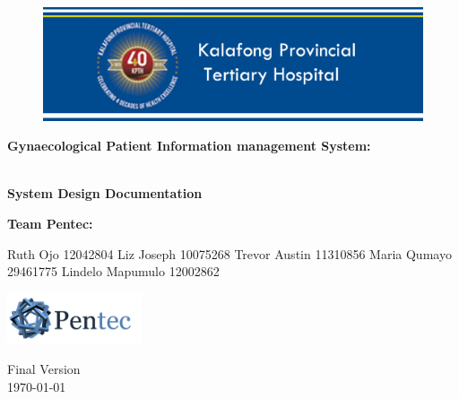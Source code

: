 \begin{titlepage}
	\begin{center}
		
		\begin{figure}[t]
			\centering
			\includegraphics[width=450px]{KPTH_Logo}
		\end{figure}		
		
		\textbf{\LARGE Gynaecological Patient Information
		management System:}
		
		\vspace{1 cm}
	    \textbf{\LARGE \\System Design Documentation}
		
		\vspace{1 cm}
		\LARGE{\textbf{Team Pentec: }}
		

		\begin{flushright} \large
			
			Ruth Ojo 12042804\newline
			Liz Joseph 10075268\newline
			Trevor Austin 11310856\newline
			Maria Qumayo 29461775\newline
			Lindelo Mapumulo 12002862\newline
		\end{flushright}
		
				\vspace{1 cm}
				\centering
				\includegraphics[width=150px]{Pentec_Logo.png}

		
		
		{\LARGE Final Version}
		\\
		{\large \today}		
		
		
	\end{center}
\end{titlepage}
